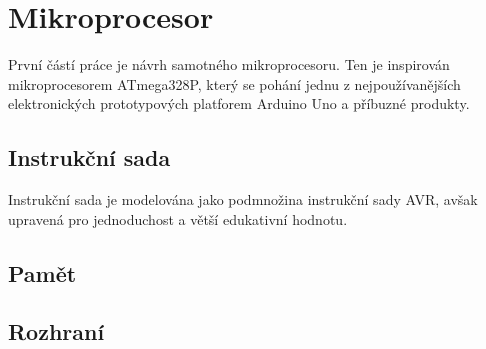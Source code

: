 \chapter{Mikroprocesor}

První částí práce je návrh samotného mikroprocesoru. Ten je inspirován mikroprocesorem ATmega328P, který se pohání jednu z nejpoužívanějších elektronických prototypových platforem Arduino Uno a příbuzné produkty.

\section{Instrukční sada}

Instrukční sada je modelována jako podmnožina instrukční sady AVR, avšak upravená pro jednoduchost a větší edukativní hodnotu.

\section{Pamět}

\blind[2]

\section{Rozhraní}

\blind[3]